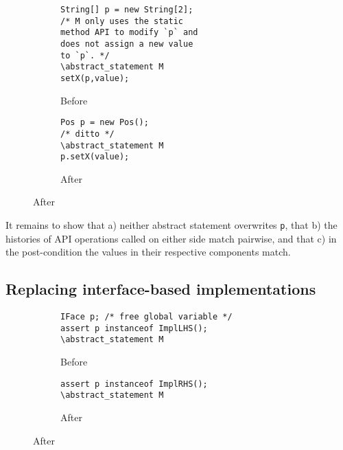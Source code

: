 \begin{figure}
  \begin{subfigure}[h]{.45\linewidth} 
    \begin{lstlisting}[style=smallJava]
String[] p = new String[2];
/* M only uses the static
method API to modify `p` and
does not assign a new value
to `p`. */
\abstract_statement M
setX(p,value);
    \end{lstlisting}
    \caption{Before}
    \label{lst:ArrayBefore}
  \end{subfigure}\hspace{1cm}
  \begin{subfigure}[h]{.45\linewidth}
        \begin{lstlisting}[style=smallJava]
Pos p = new Pos();
/* ditto */
\abstract_statement M
p.setX(value);
    \end{lstlisting}
    \caption{After}
    \label{lst:ArrayAfter}
  \end{subfigure}
  \label{lst:ReplaceArray-REF}
\end{figure}

It remains to show that a) neither abstract statement overwrites \texttt{p}, that b) the histories of API operations called on either side match pairwise,
and that c) in the post-condition the values in their respective components match.


\subsection*{Replacing interface-based implementations}

\begin{figure}
  \begin{subfigure}[h]{.45\linewidth} 
    \begin{lstlisting}[style=smallJava]
IFace p; /* free global variable */
assert p instanceof ImplLHS();
\abstract_statement M
    \end{lstlisting}
    \caption{Before}
    \label{lst:IFaceBefore}
  \end{subfigure}\hspace{1cm}
  \begin{subfigure}[h]{.45\linewidth}
        \begin{lstlisting}[style=smallJava]
assert p instanceof ImplRHS();
\abstract_statement M
    \end{lstlisting}
    \caption{After}
    \label{lst:iFaceAfter}
  \end{subfigure}
  \label{lst:refa-ibased}
\end{figure}

